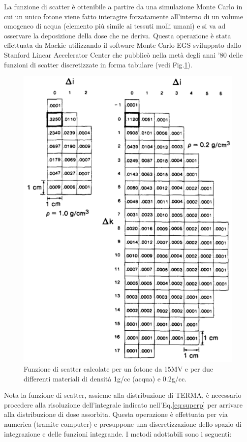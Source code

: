 {La funzione di scatter è ottenibile a partire da una simulazione Monte Carlo in cui un unico fotone viene fatto interagire forzatamente all'interno di un volume omogeneo di acqua (elemento più simile ai tessuti molli umani) e si va ad osservare la deposizione della dose che ne deriva. Questa operazione è stata effettuata da Mackie \cite{Mackie1985} utilizzando il software Monte Carlo EGS sviluppato dallo Stanford Linear Accelerator Center che pubblicò nella metà degli anni '80 delle funzioni di scatter discretizzate in forma tabulare (vedi Fig.\ref{fig:mackie_kernels}).
\begin{figure}
\centering
\includegraphics[width=.8\textwidth]{./cap1/mackie_kernels.png}
\caption{Funzione di scatter calcolate per un fotone da 15MV e per due differenti materiali di densità  1g/cc (acqua) e 0.2g/cc. \cite{Mackie1985}}
\label{fig:mackie_kernels}
\end{figure}

Nota la funzione di scatter, assieme alla distribuzione di TERMA, è necessario procedere alla risoluzione dell'integrale indicato nell'Eq.\eqref{eq:superp} per arrivare alla distribuzione di dose assorbita. 
Questa operazione è effettuata per via numerica (tramite computer) e presuppone una discretizzazione dello spazio di integrazione e delle funzioni integrande. I metodi adottabili sono i seguenti:\\

}

